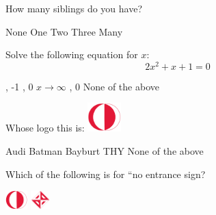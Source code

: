 \documentclass{exam}
\begin{document}
 
\begin{questions}\question How many siblings do you have? \newline
\begin{oneparchoices}
 \choice None\newline
 \choice One\newline
 \choice Two\newline
 \choice Three\newline
 \choice Many\newline
\end{oneparchoices}
\newline\question Solve the following equation for $x$:\
\[ 2 x^2 + x + 1 = 0 \] \newline
\begin{oneparchoices}
 , -1\newline
 \choice 1, 0\newline
 \choice $x \rightarrow \infty$\newline
 , 0\newline
 \choice None of the above\newline
\end{oneparchoices}
\newline\question Whose logo this is:\newline 
\includegraphics[height=3em]{metulogo} \newline
\begin{oneparchoices}
 \choice Audi\newline
 \choice Batman\newline
 \choice Bayburt\newline
 \choice THY\newline
 \choice None of the above\newline
\end{oneparchoices}
\newline\question Which of the following is for ``no entrance sign? \newline
\begin{oneparchoices}
 \choice \includegraphics[height=2em]{metulogo}\newline
 \choice \includegraphics[height=2em]{cenglogo}\newline

\end{oneparchoices}
\end{questions}
\end{document}
